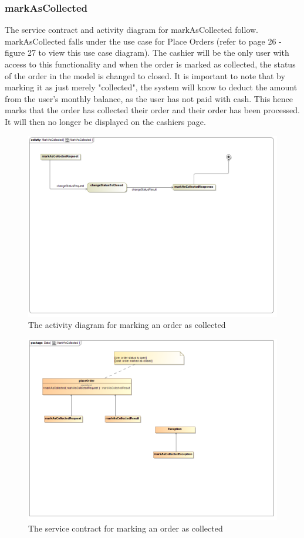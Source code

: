 \documentclass[a4paper,12pt]{report}
\begin{document}
\subsubsection{markAsCollected}
The service contract and activity diagram for markAsCollected follow. markAsCollected falls under the use case for Place Orders (refer to page 26 - figure 27 to view this use case diagram). The cashier will be the only user with access to this functionality and when the order is marked as collected, the status of the order in the model is changed to closed. It is important to note that by marking it as just merely "collected", the system will know to deduct the amount from the user's monthly balance, as the user has not paid with cash. This hence marks that the order has collected their order and their order has been processed. It will then no longer be displayed on the cashiers page.
\begin{figure}[H]
  \centering
    \includegraphics[width=1.0\textwidth]{../images/MarkAsCollectedActivity.png}
    \caption{The activity diagram for marking an order as collected } 
\end{figure}
 
\begin{figure}[H]
	\centering
	\includegraphics[width=1.0\textwidth]{../images/MarkAsCollectedSC.png}
	\caption{The service contract for marking an order as collected}
\end{figure}
\end{document}
